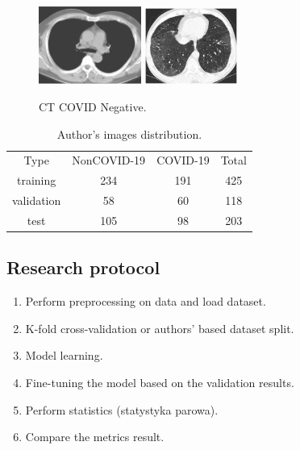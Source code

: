 \documentclass[runningheads]{llncs}
\begin{document}
\begin{figure}[h]
\centering
{
\includegraphics[width=0.30\textwidth]{imagesDatasetSection/noncovid1.jpg}
}
\quad
{
\includegraphics[width=0.27\textwidth]{imagesDatasetSection/noncovid2.jpg}
}
\label{covidNegative}
\caption{CT COVID Negative.}
\end{figure}

\begin{table}[h]
\label{imageDistributionAuthors}
\centering
\caption{Author's images distribution.}
\begin{tabular}{c|c|c|c}
\cline{1-4}
Type & NonCOVID-19 & COVID-19 & Total \\ \cline{1-4}
training & 234 & 191 & 425\\ \cline{1-4}
validation & 58 & 60 & 118\\ \cline{1-4}
test & 105  & 98 & 203\\ \cline{1-4}
\end{tabular}
\end{table} 


\subsection{Research protocol}
\begin{enumerate}
  \item Perform preprocessing on data and load dataset.
  \item K-fold cross-validation or authors' based dataset split.
  \item Model learning.
  \item Fine-tuning the model based on the validation results.
  \item Perform statistics (statystyka parowa).
  \item Compare the metrics result.
\end{enumerate}
\end{document}
